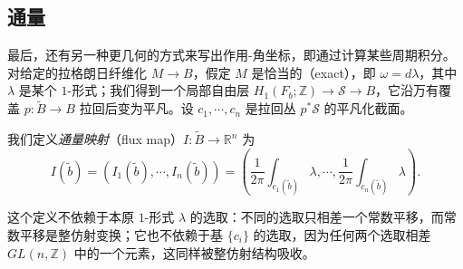 
\subsection{通量}

最后，还有另一种更几何的方式来写出作用-角坐标，即通过计算某些周期积分。对给定的拉格朗日纤维化 $M\to B$，假定 $M$ 是恰当的（exact），即 $\omega =d\lambda$，其中 $\lambda$ 是某个 $1$-形式；我们得到一个局部自由层 $H_1 (F_b;\mathbb{Z})\to\mathcal{S}\to B$，它沿万有覆盖 $p\colon\tilde{B}\to B$ 拉回后变为平凡。设 $c_1,\dotsb, c_n$ 是拉回丛 $p^{\ast}\mathcal{S}$ 的平凡化截面。


\begin{definition*}
我们定义\emph{通量映射}（flux map）$I\colon\tilde{B}\to\mathbb{R}^n$ 为
\[
  I(\tilde{b})=(I_1 (\tilde{b}),\dotsb, I_n (\tilde{b}))=\left(\frac{1}{2\pi}\int_{c_1 (\tilde{b})}\lambda,\dotsb, \frac{1}{2\pi}\int_{c_n (\tilde{b})}\lambda\right).
\]
\end{definition*}

这个定义不依赖于本原 $1$-形式 $\lambda$ 的选取：不同的选取只相差一个常数平移，而常数平移是整仿射变换；它也不依赖于基 $\{c_i\}$ 的选取，因为任何两个选取相差 $GL(n,\mathbb{Z})$ 中的一个元素，这同样被整仿射结构吸收。


